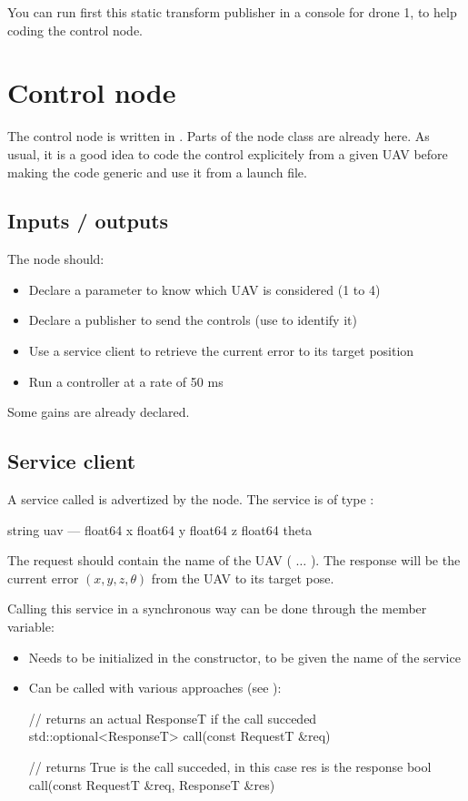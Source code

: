 \documentclass{ecnreport}
\begin{document}
 You can run first this static transform publisher in a console for drone 1, to help coding the control node.

\section{Control node}

The control node is written in . Parts of the node class are already here.
As usual, it is a good idea to code the control explicitely from a given UAV before making the code generic and use it from a launch file.

\subsection{Inputs / outputs}

The node should:
\begin{itemize}
 \item Declare a parameter to know which UAV is considered (1 to 4)
 \item Declare a publisher to send the controls (use  to identify it)
 \item Use a service client to retrieve the current error to its target position
 \item Run a controller at a rate of 50 ms
\end{itemize}

Some gains are already declared.

\subsection{Service client}

A service called  is advertized by the  node. The service is of type :
\begin{bashcode}
string uav
---
float64 x
float64 y
float64 z
float64 theta
\end{bashcode}
The request should contain the name of the UAV ( $\hdots$ ). The response will be the current error $(x,y,z,\theta)$ from the UAV to its target pose.

Calling this service in a synchronous way can be done through the  member variable:
\begin{itemize}
 \item Needs to be initialized in the constructor, to be given the name of the service
 \item Can be called with various approaches (see ):
 \begin{cppcode}
  // returns an actual ResponseT if the call succeded
  std::optional<ResponseT> call(const RequestT &req)

  // returns True is the call succeded, in this case res is the response
  bool call(const RequestT &req, ResponseT &res)
 \end{cppcode}
\end{itemize}
\end{document}

